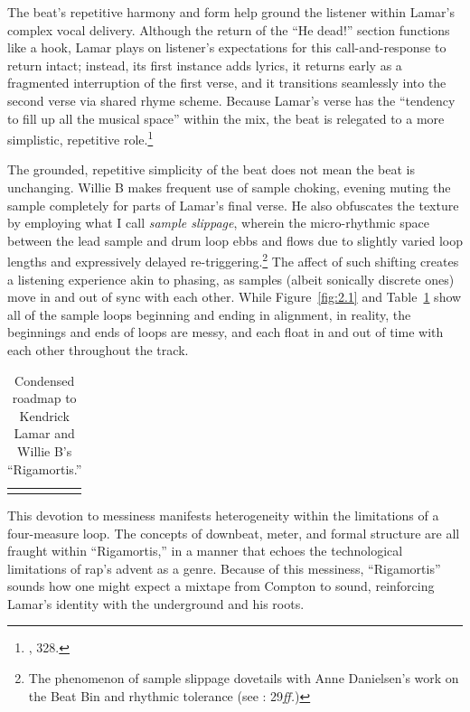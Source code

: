 The beat's repetitive harmony and form help ground the listener within Lamar's complex vocal delivery. Although the return of the ``He dead!'' section functions like a hook, Lamar plays on listener's expectations for this call-and-response to return intact; instead, its first instance adds lyrics, it returns early as a fragmented interruption of the first verse, and it transitions seamlessly into the second verse via shared rhyme scheme. Because Lamar's verse has the ``tendency to fill up all the musical space'' within the mix,  the beat is relegated to a more simplistic, repetitive role.\footnote{\cite{ollywilsonHeterogeneousSoundIdeal1992}, 328.}

The grounded, repetitive simplicity of the beat does not mean the beat is unchanging. Willie B makes frequent use of sample choking, evening muting the sample completely for parts of Lamar's final verse. He also obfuscates the texture by employing what I call \emph{sample slippage}, wherein the micro-rhythmic space between the lead sample and drum loop ebbs and flows due to slightly varied loop lengths and expressively delayed re-triggering.\footnote{The phenomenon of sample slippage dovetails with Anne Danielsen's work on the Beat Bin and rhythmic tolerance (see \cite{annedanielsenHereThereEverywhere2016}: 29\textit{ff.})} The affect of such shifting creates a listening experience akin to phasing, as samples (albeit sonically discrete ones) move in and out of sync with each other.  While Figure~\ref{fig:2.1} and Table~\ref{tab:rigamortis} show all of the sample loops beginning and ending in alignment, in reality, the beginnings and ends of loops are messy, and each float in and out of time with each other throughout the track.

\begin{table}[h]
    \centering
        \begin{tabular}{|c|c|}
            \hline
             &  \\ \hline
             & \\ \hline
        \end{tabular}
    \caption{Condensed roadmap to Kendrick Lamar and Willie B's ``Rigamortis.''}
    \label{tab:rigamortis}
\end{table}

\normalsize This devotion to messiness manifests heterogeneity within the limitations of a four-measure loop. The concepts of downbeat, meter, and formal structure are all fraught within ``Rigamortis,'' in a manner that echoes the technological limitations of rap's advent as a genre. Because of this messiness, ``Rigamortis'' sounds how one might expect a mixtape from Compton to sound, reinforcing Lamar's identity with the underground and his roots.

